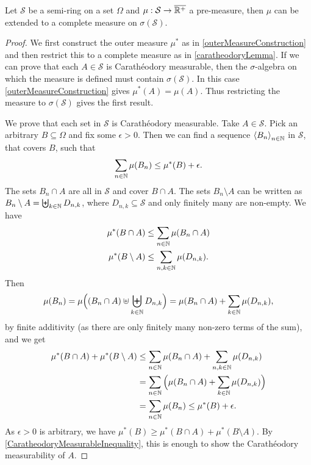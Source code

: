 \begin{theorem} \label{premeasureExtensionTheorem}
Let $\mathcal{S}$ be a semi-ring on a set $\Omega$ and $\mu: \mathcal{S}\to \overline{\mathbb{R}^+}$ a pre-measure, then $\mu$ can be extended to a complete measure on $\sigma(\mathcal{S})$.
\end{theorem}
\begin{proof}
We first construct the outer measure $\mu^*$ as in \ref{outerMeasureConstruction} and then restrict this to a complete measure as in \ref{caratheodoryLemma}. If we can prove that each $A\in \mathcal{S}$ is Carathéodory measurable, then the $\sigma$-algebra on which the measure is defined must contain $\sigma(\mathcal{S})$. In this case \ref{outerMeasureConstruction} gives $\mu^*(A) = \mu(A)$. Thus restricting the measure to $\sigma(\mathcal{S})$ gives the first result.

We prove that each set in $\mathcal{S}$ is Carathéodory measurable. Take $A\in \mathcal{S}$. Pick an arbitrary $B\subseteq \Omega$ and fix some $\epsilon > 0$. Then we can find a sequence $\left\langle B_n \right\rangle_{n\in\mathbb{N}}$ in $\mathcal{S}$, that covers $B$, such that
\[ \sum_{n\in\mathbb{N}}\mu(B_n) \leq \mu^*(B) + \epsilon. \]
The sets $B_n\cap A$ are all in $\mathcal{S}$ and cover $B\cap A$. The sets $B_n\setminus A$ can be written as $B_n\setminus A = \biguplus_{k\in\mathbb{N}}D_{n,k}$, where $D_{n,k}\subseteq\mathcal{S}$ and only finitely many are non-empty.
We have
\begin{align*}
\mu^*(B\cap A) &\leq \sum_{n\in\mathbb{N}}\mu(B_n\cap A) \\
\mu^*(B\setminus A) &\leq \sum_{n,k\in\mathbb{N}} \mu(D_{n,k}).
\end{align*}
Then
\[ \mu(B_n) = \mu\Big((B_n\cap A) \uplus \biguplus_{k\in\mathbb{N}}D_{n,k}\Big) = \mu(B_n\cap A) + \sum_{k\in \mathbb{N}}\mu(D_{n,k}),  \]
by finite additivity (as there are only finitely many non-zero terms of the sum), and we get
\begin{align*}
\mu^*(B\cap A) + \mu^*(B\setminus A) &\leq \sum_{n\in\mathbb{N}}\mu(B_n\cap A) + \sum_{n,k\in\mathbb{N}} \mu(D_{n,k}) \\
&= \sum_{n\in\mathbb{N}}\Big(\mu(B_n\cap A) + \sum_{k\in\mathbb{N}}\mu(D_{n,k})\Big) \\
&= \sum_{n\in\mathbb{N}}\mu(B_n) \leq \mu^*(B) + \epsilon.
\end{align*}
As $\epsilon >0$ is arbitrary, we have $\mu^*(B) \geq \mu^*(B\cap A) + \mu^*(B\setminus A)$. By \ref{CaratheodoryMeasurableInequality}, this is enough to show the Carathéodory measurability of $A$.
\end{proof}

